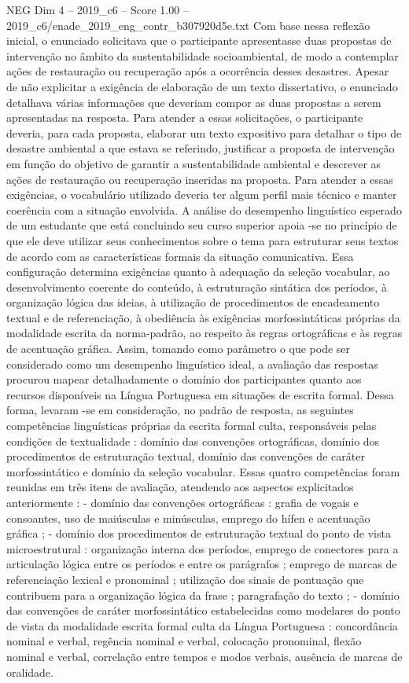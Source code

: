 \begin{textsample}{NEG Dim 4 – 2019\_c6 – Score 1.00 – 2019\_c6/enade\_2019\_eng\_contr\_b307920d5e.txt}
Com base nessa reflexão inicial, o enunciado solicitava que o participante apresentasse duas propostas de intervenção no âmbito da sustentabilidade socioambiental, de modo a contemplar ações de restauração ou recuperação após a ocorrência desses desastres.
Apesar de não explicitar a exigência de elaboração de um texto dissertativo, o enunciado detalhava várias informações que deveriam compor as duas propostas a serem apresentadas na resposta.
Para atender a essas solicitações, o participante deveria, para cada proposta, elaborar um texto expositivo para detalhar o tipo de desastre ambiental a que estava se referindo, justificar a proposta de intervenção em função do objetivo de garantir a sustentabilidade ambiental e descrever as ações de restauração ou recuperação inseridas na proposta.
Para atender a essas exigências, o vocabulário utilizado deveria ter algum perfil mais técnico e manter coerência com a situação envolvida.
A análise do desempenho linguístico esperado de um estudante que está concluindo seu curso superior apoia -se no princípio de que ele deve utilizar seus conhecimentos sobre o tema para estruturar seus textos de acordo com as características formais da situação comunicativa.
Essa configuração determina exigências quanto à adequação da seleção vocabular, ao desenvolvimento coerente do conteúdo, à estruturação sintática dos períodos, à organização lógica das ideias, à utilização de procedimentos de encadeamento textual e de referenciação, à obediência às exigências morfossintáticas próprias da modalidade escrita da norma-padrão, ao respeito às regras ortográficas e às regras de acentuação gráfica.
Assim, tomando como parâmetro o que pode ser considerado como um desempenho linguístico ideal, a avaliação das respostas procurou mapear detalhadamente o domínio dos participantes quanto aos recursos disponíveis na Língua Portuguesa em situações de escrita formal.
Dessa forma, levaram -se em consideração, no padrão de resposta, as seguintes competências linguísticas próprias da escrita formal culta, responsáveis pelas condições de textualidade : domínio das convenções ortográficas, domínio dos procedimentos de estruturação textual, domínio das convenções de caráter morfossintático e domínio da seleção vocabular.
Essas quatro competências foram reunidas em três itens de avaliação, atendendo aos aspectos explicitados anteriormente : - domínio das convenções ortográficas : grafia de vogais e consoantes, uso de maiúsculas e minúsculas, emprego do hífen e acentuação gráfica ; - domínio dos procedimentos de estruturação textual do ponto de vista microestrutural : organização interna dos períodos, emprego de conectores para a articulação lógica entre os períodos e entre os parágrafos ; emprego de marcas de referenciação lexical e pronominal ; utilização dos sinais de pontuação que contribuem para a organização lógica da frase ; paragrafação do texto ; - domínio das convenções de caráter morfossintático estabelecidas como modelares do ponto de vista da modalidade escrita formal culta da Língua Portuguesa : concordância nominal e verbal, regência nominal e verbal, colocação pronominal, flexão nominal e verbal, correlação entre tempos e modos verbais, ausência de marcas de oralidade.

\end{textsample}
